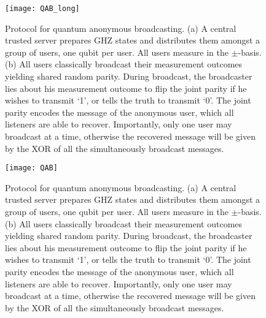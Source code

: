 \pubmode
\begin{figure}[!htbp]
\texttt{[image: QAB\_long]}
\captionspacefig \caption{Protocol for quantum anonymous broadcasting. (a) A central trusted server prepares GHZ states and distributes them amongst a group of users, one qubit per user. All users measure in the $\pm$-basis. (b) All users classically broadcast their measurement outcomes yielding shared random parity. During broadcast, the broadcaster lies about his measurement outcome to flip the joint parity if he wishes to transmit `1', or tells the truth to transmit `0'. The joint parity encodes the message of the anonymous user, which all listeners are able to recover. Importantly, only one user may broadcast at a time, otherwise the recovered message will be given by the XOR of all the simultaneously broadcast messages.} \label{fig:QAB}
\end{figure}
\else
\begin{figure*}[!htbp]
\texttt{[image: QAB]}
\captionspacefig \caption{Protocol for quantum anonymous broadcasting. (a) A central trusted server prepares GHZ states and distributes them amongst a group of users, one qubit per user. All users measure in the $\pm$-basis. (b) All users classically broadcast their measurement outcomes yielding shared random parity. During broadcast, the broadcaster lies about his measurement outcome to flip the joint parity if he wishes to transmit `1', or tells the truth to transmit `0'. The joint parity encodes the message of the anonymous user, which all listeners are able to recover. Importantly, only one user may broadcast at a time, otherwise the recovered message will be given by the XOR of all the simultaneously broadcast messages.} \label{fig:QAB}
\end{figure*}
\fi

